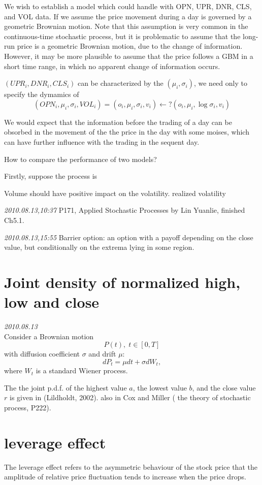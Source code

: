 \documentclass[11pt,a4paper]{article}
\begin{document}
\begin{enumerate}
We wish to establish a model which could handle with OPN, UPR, DNR, CLS, and VOL data. If we assume the price movement during a day is governed by a geometric Brownian motion. Note that this assumption is very common in the 
continuous-time stochastic process, but it is problematic to assume that the long-run price is a geometric Brownian motion, due to the change of information. However, it may be more plausible to assume that the price follows a GBM in a short time range, in which no apparent change of information occurs.

$( UPR_i, DNR_i, CLS_i ) $ can be characterized by the $ (\mu_i, \sigma_i) $,  we need only to specify the dymamics of $$ (OPN_i,\mu_i,\sigma_i, VOL_i)=(o_i,\mu_i,\sigma_i,v_i)\leftarrow ?(o_i,\mu_i,\log \sigma_i,v_i) $$

We would expect that the information before the trading of a day can be obsorbed in the movement of the the price in the day with some moises, which can have further influence with the trading in the sequent day.

How to compare the performance of two models?

Firstly, suppose the process is 



Volume should have positive impact on the volatility.
realized volatility

\textit{2010.08.13,10:37} P171, Applied Stochastic Processes by Lin Yuanlie, finished Ch5.1.

\textit{2010.08.13,15:55}
Barrier option: an option with a payoff depending on the close value, but conditionally on the extrema lying in some region.
\end{enumerate}


\section{Joint density of normalized high, low and close}
\textit{2010.08.13}\\
Consider a Brownian motion
\[ P(t),\; t\in[0,T] \]
with diffusion coefficient $ \sigma $ and drift $ \mu $:
\[ dP_t=\mu d t+\sigma d W_t,\]
where $W_t$ is a standard Wiener process.

The the joint p.d.f. of the highest value $a$, the lowest value $b$, and the close value $r$ is given in (Lildholdt, 2002).
also in Cox and Miller ( the theory of stochastic process, P222).

\section{leverage effect}
The leverage effect refers to the asymmetric behaviour of the stock price that the amplitude of relative price fluctuation tends to increase when the price drops.
\end{document}
